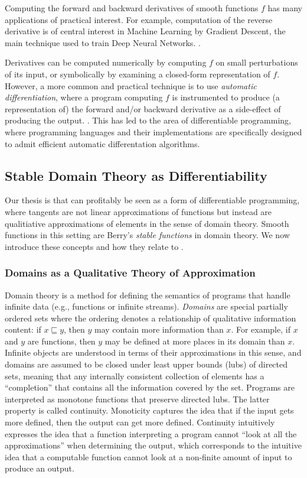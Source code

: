 Computing the forward and backward derivatives of smooth functions $f$ has many applications of practical interest. For example, computation of the reverse derivative is of central interest in Machine Learning by Gradient Descent, the main technique used to train Deep Neural Networks. .

Derivatives can be computed numerically by computing $f$ on small perturbations of its input, or symbolically by examining a closed-form representation of $f$. However, a more common and practical technique is to use \emph{automatic differentiation}, where a program computing $f$ is instrumented to produce (a representation of) the forward and/or backward derivative as a side-effect of producing the output. . This has led to the area of differentiable programming, where programming languages and their implementations are specifically designed to admit efficient automatic differentation algorithms. 

\subsection{Stable Domain Theory as Differentiability}

Our thesis is that \GPS can profitably be seen as a form of differentiable programming, where tangents are not linear approximations of functions but instead are qualitiative approximations of elements in the sense of domain theory. Smooth functions in this setting are Berry's \emph{stable functions} in domain theory. We now introduce these concepts and how they relate to \GPS.

\subsubsection{Domains as a Qualitative Theory of Approximation}

Domain theory is a method for defining the semantics of programs that
handle infinite data (e.g., functions or infinite
streams). \emph{Domains} are special partially ordered sets where the
ordering denotes a relationship of qualitative information content: if
$x \sqsubseteq y$, then $y$ may contain more information than $x$. For
example, if $x$ and $y$ are functions, then $y$ may be defined at more
places in its domain than $x$. Infinite objects are understood in
terms of their approximations in this sense, and domains are assumed
to be closed under least upper bounds (lubs) of directed sets, meaning
that any internally consistent collection of elements has a
``completion'' that contains all the information covered by the
set. Programs are interpreted as monotone functions that preserve
directed lubs. The latter property is called continuity. Monoticity
captures the idea that if the input gets more defined, then the output
can get more defined. Continuity intuitively expresses the idea that a
function interpreting a program cannot ``look at all the
approximations'' when determining the output, which corresponds to the
intuitive idea that a computable function cannot look at a non-finite
amount of input to produce an output.

